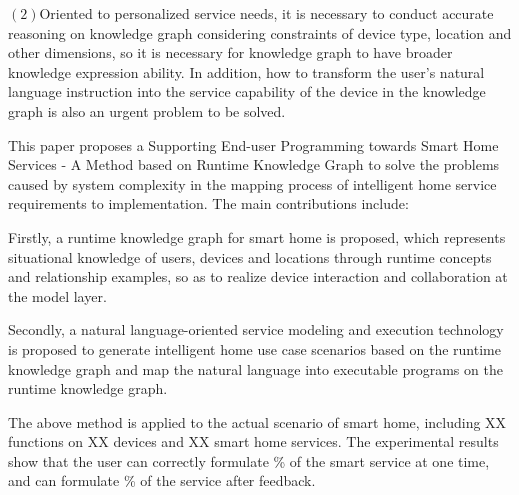 $(2)$Oriented to personalized service needs, it is necessary to conduct accurate reasoning on knowledge graph considering constraints of device type, location and other dimensions, so it is necessary for knowledge graph to have broader knowledge expression ability. In addition, how to transform the user's natural language instruction into the service capability of the device in the knowledge graph is also an urgent problem to be solved.

This paper proposes a Supporting End-user Programming towards Smart Home Services - A Method based on Runtime Knowledge Graph to solve the problems caused by system complexity in the mapping process of intelligent home service requirements to implementation. The main contributions include:

Firstly, a runtime knowledge graph for smart home is proposed, which represents situational knowledge of users, devices and locations through runtime concepts and relationship examples, so as to realize device interaction and collaboration at the model layer.

Secondly, a natural language-oriented service modeling and execution technology is proposed to generate intelligent home use case scenarios based on the runtime knowledge graph and map the natural language into executable programs on the runtime knowledge graph.

The above method is applied to the actual scenario of smart home, including XX functions on XX devices and XX smart home services. The experimental results show that the user can correctly formulate \% of the smart service at one time, and can formulate \% of the service after feedback.
